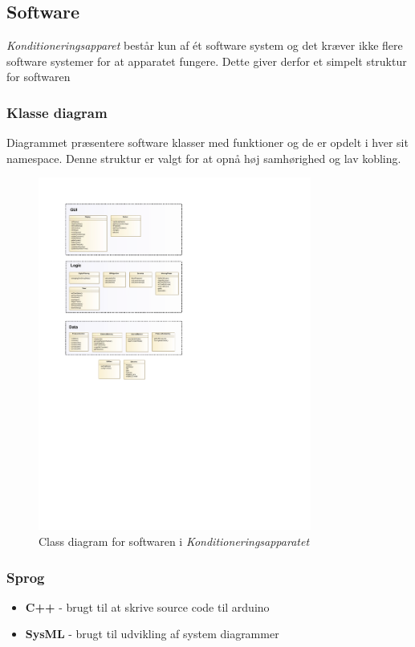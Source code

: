 \subsection{Software}
\textit{Konditioneringsapparet} består kun af ét software system og det kræver ikke flere software systemer for at apparatet fungere. Dette giver derfor et simpelt struktur for softwaren 

\subsubsection{Klasse diagram}
Diagrammet præsentere software klasser med funktioner og de er opdelt i hver sit namespace. Denne struktur er valgt for at opnå høj samhørighed og lav kobling.
\begin{figure}[H]
	\centering
	\includegraphics[width=0.8\textwidth]{pdfs/ClassDiagram.pdf}
	\caption{Class diagram for softwaren i \textit{Konditioneringsapparatet}}
\end{figure}


\subsubsection{Sprog}
\begin{itemize}
	\item \textbf{C++} - brugt til at skrive source code til arduino
	\item \textbf{SysML} - brugt til udvikling af system diagrammer
\end{itemize}

